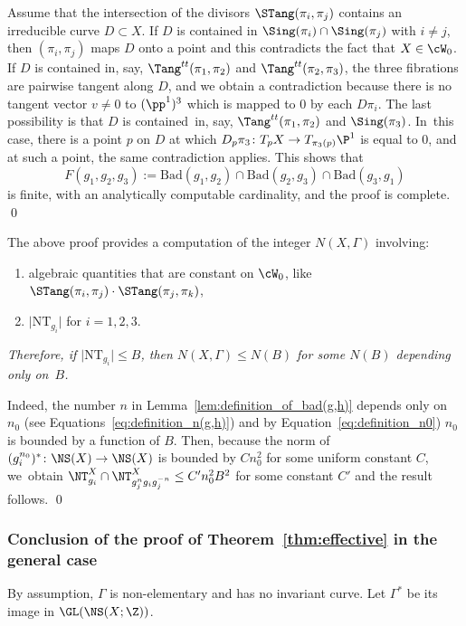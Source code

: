 Assume that the intersection of the divisors $\STang(\pi_i, \pi_j)$ contains an irreducible curve $D\subset X$. If $D$ is contained in $\Sing(\pi_i)\cap \Sing(\pi_j)$ with $i\neq j$, then $(\pi_i, \pi_j)$ maps $D$ onto a point and this contradicts the fact that $X\in { \cW}_0$. If $D$ is contained in, say, $\Tang^{tt}(\pi_1,\pi_2)$
and $\Tang^{tt}(\pi_2, \pi_3)$, the three fibrations are pairwise tangent along $D$, and we obtain a contradiction because there is no tangent vector $v\neq 0$ to $(\pp^1)^3$ which is mapped to $0$ by each $D\pi_i$. The last possibility is that $D$ is contained~in, say, $\Tang^{tt}(\pi_1,\pi_2)$ and $\Sing(\pi_3)$. In~this case, there is a point $p$ on $D$ at which $D_p\pi_3\colon T_pX\to T_{\pi_3(p)}\P^1$ is equal to $0$, and
at such a point, the same contradiction applies. This shows that
\begin{equation}\label{eq:finite-bad-set}
F(g_1,g_2,g_3):=\mathrm{Bad}(g_1,g_2)\cap \mathrm{Bad}(g_2,g_3)\cap \mathrm{Bad}(g_3,g_1)
\end{equation}
is finite, with an analytically computable cardinality, and the proof is complete. \qed

\begin{rem}\label{rem:N(X)}
The above proof provides a computation of the integer $N(X, \Gamma)$ involving:
\begin{enumerate}
\item\label{rem:N(X)1} algebraic quantities that are constant on $\cW_0$, like $\STang(\pi_i,\pi_j)\cdot \STang(\pi_j,\pi_k)$,
\item\label{rem:N(X)2} $\vert \mathrm{NT}_{g_i}\vert$ for
$i=1, 2, 3$.
\end{enumerate}
{\textit{Therefore, if $\vert \mathrm{NT}_{g_i}\vert \leq B$, then $N(X,\Gamma)\leq N(B)$ for some $N(B)$ depending only on~$B$.}}

Indeed, the number $n$ in Lemma~\ref{lem:definition_of_bad(g,h)} depends only on $n_0$ (see Equations~\eqref{eq:definition_n(g,h)}) and by Equation~\eqref{eq:definition_n0}) $n_0$ is bounded by a function of $B$.
Then, because the norm of $(g_i^{n_0})^*\colon \NS(X)\to \NS(X)$ is bounded by $Cn_0^2$ for some uniform constant $C$, we~obtain
$\NT_{g_i}^X \cap \NT_{g_j^ng_ig_j^{-n}}^X\leq C' n_0^2 B^2$
for some constant $C'$ and the result follows. \qed
\end{rem}

\subsubsection*{Conclusion of the proof of Theorem~\ref{thm:effective} in the general case}%
By assumption, $\Gamma$ is non-elementary and has no invariant curve. Let $\Gamma^*$ be its image in $\GL(\NS(X;\Z))$.

